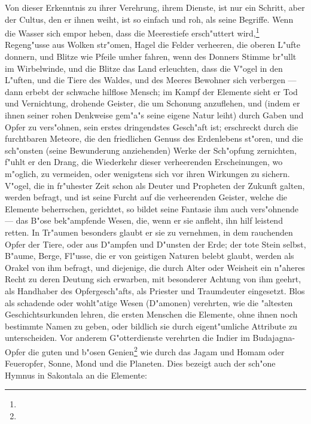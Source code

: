 \documentclass[a4paper, 11pt, oneside, polutonikogreek, german]{article}
\begin{document}
Von dieser Erkenntnis zu ihrer Verehrung, ihrem Dienste, ist nur ein Schritt, aber der Cultus, den er ihnen weiht, ist so einfach und roh, als seine Begriffe. Wenn die Wasser sich empor heben, dass die Meerestiefe ersch"uttert wird,\footnote{} Regeng"usse aus Wolken str"omen, Hagel die Felder verheeren, die oberen L"ufte donnern, und Blitze wie Pfeile umher fahren, wenn des Donners Stimme br"ullt im Wirbelwinde, und die Blitze das Land erleuchten, dass die V"ogel in den L"uften, und die Tiere des Waldes, und des Meeres Bewohner sich verbergen --- dann erbebt der schwache hilflose Mensch; im Kampf der Elemente sieht er Tod und Vernichtung, drohende Geister, die um Schonung anzuflehen, und (indem er ihnen seiner rohen Denkweise gem"a"s seine eigene Natur leiht) durch Gaben und Opfer zu vers"ohnen, sein erstes dringendstes Gesch"aft ist; erschreckt durch die furchtbaren Meteore, die den friedlichen Genuss des Erdenlebens st"oren, und die sch"onsten (seine Bewunderung anziehenden) Werke der Sch"opfung zernichten, f"uhlt er den Drang, die Wiederkehr dieser verheerenden Erscheinungen, wo m"oglich, zu vermeiden, oder wenigstens sich vor ihren Wirkungen zu sichern. V"ogel, die in fr"uhester Zeit schon als Deuter und Propheten der Zukunft galten, werden befragt, und ist seine Furcht auf die verheerenden Geister, welche die Elemente beherrschen, gerichtet, so bildet seine Fantasie ihm auch vers"ohnende --- das B"ose bek"ampfende Wesen, die, wenn er sie anfleht, ihn hilf leistend retten. In Tr"aumen besonders glaubt er sie zu vernehmen, in dem rauchenden Opfer der Tiere, oder aus D"ampfen und D"unsten der Erde; der tote Stein selbst, B"aume, Berge, Fl"usse, die er von geistigen Naturen belebt glaubt, werden als Orakel von ihm befragt, und diejenige, die durch Alter oder Weisheit ein n"aheres Recht zu deren Deutung sich erwarben, mit besonderer Achtung von ihm geehrt, als Handhaber des Opfergesch"afts, als Priester und Traumdeuter eingesetzt. Blos als schadende oder wohlt"atige Wesen (D"amonen) verehrten, wie die "altesten Geschichtsurkunden lehren, die ersten Menschen die Elemente, ohne ihnen noch bestimmte Namen zu geben, oder bildlich sie durch eigent"umliche Attribute zu unterscheiden. Vor anderem G"otterdienste verehrten die Indier im Budajagna-Opfer die guten und b"osen Genien\footnote{} wie durch das Jagam und Homam oder Feueropfer, Sonne, Mond und die Planeten. Dies bezeigt auch der sch"one Hymnus in Sakontala an die Elemente:
\vspace{9pt}
\end{document}
